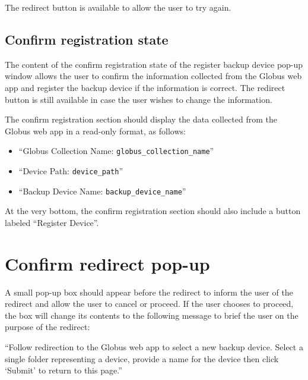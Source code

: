 \noindent The redirect button is available to allow the user to try again.

\subsection{Confirm registration state}

The content of the confirm registration state of the register backup device pop-up window 
allows the user to confirm the information collected from the Globus web app and register
the backup device if the information is correct. The redirect button is still available
in case the user wishes to change the information. 

The confirm registration section should display the data collected from the Globus web app 
in a read-only format, as follows:

\begin{itemize}\itemsep1pt
    \item ``Globus Collection Name: \texttt{globus\_collection\_name}''
    \item ``Device Path: \texttt{device\_path}''
    \item ``Backup Device Name: \texttt{backup\_device\_name}''
\end{itemize}

\noindent At the very bottom, the confirm registration section should also include a button 
labeled ``Register Device''.

\section{Confirm redirect pop-up\label{sec:confirm-redirect-popup}}

A small pop-up box should appear before the redirect to inform the user of the redirect 
and allow the user to cancel or proceed. If the user chooses to proceed, the box will change
its contents to the following message to brief the user on the purpose of the redirect:

\vspace{3mm}
``Follow redirection to the Globus web app to select a new backup device. Select a single
folder representing a device, provide a name for the device then click `Submit' to return 
to this page.''
\vspace{3mm}